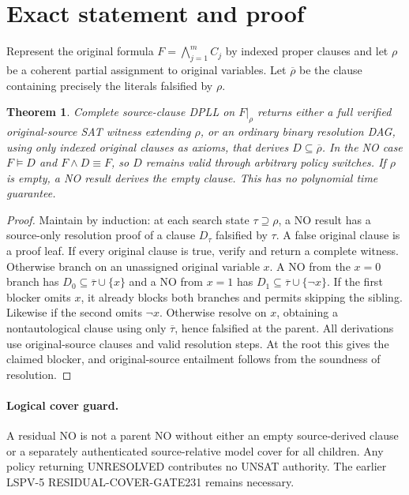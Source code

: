 \documentclass[11pt]{article}
\newtheorem{theorem}{Theorem}
\begin{document}
\section{Exact statement and proof}
Represent the original formula $F=\bigwedge_{j=1}^{m}C_j$ by indexed proper clauses and let $\rho$ be a coherent partial assignment to original variables. Let $\overline\rho$ be the clause containing precisely the literals falsified by $\rho$.
\begin{theorem}
Complete source-clause DPLL on $F|_\rho$ returns either a full verified original-source SAT witness extending $\rho$, or an ordinary binary resolution DAG, using only indexed original clauses as axioms, that derives $D\subseteq\overline\rho$. In the NO case $F\models D$ and $F\wedge D\equiv F$, so $D$ remains valid through arbitrary policy switches. If $\rho$ is empty, a NO result derives the empty clause. This has no polynomial time guarantee.
\end{theorem}
\begin{proof}
Maintain by induction: at each search state $\tau\supseteq\rho$, a NO result has a source-only resolution proof of a clause $D_\tau$ falsified by $\tau$. A false original clause is a proof leaf. If every original clause is true, verify and return a complete witness. Otherwise branch on an unassigned original variable $x$. A NO from the $x=0$ branch has $D_0\subseteq\overline\tau\cup\{x\}$ and a NO from $x=1$ has $D_1\subseteq\overline\tau\cup\{\neg x\}$. If the first blocker omits $x$, it already blocks both branches and permits skipping the sibling. Likewise if the second omits $\neg x$. Otherwise resolve on $x$, obtaining a nontautological clause using only $\overline\tau$, hence falsified at the parent. All derivations use original-source clauses and valid resolution steps. At the root this gives the claimed blocker, and original-source entailment follows from the soundness of resolution.
\end{proof}
\paragraph{Logical cover guard.} A residual NO is not a parent NO without either an empty source-derived clause or a separately authenticated source-relative model cover for all children. Any policy returning UNRESOLVED contributes no UNSAT authority. The earlier LSPV-5 RESIDUAL-COVER-GATE231 remains necessary.
\end{document}
